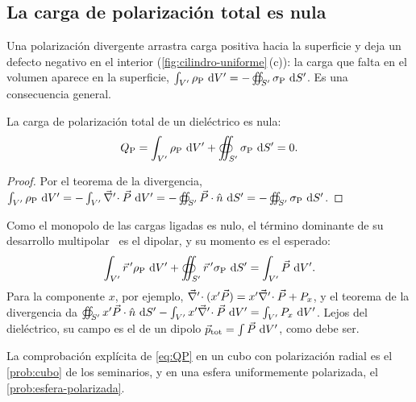 

\subsection{La carga de polarización total es nula}\label{sec:carga-total}

Una polarización divergente arrastra carga positiva hacia la superficie y deja un defecto negativo en el
interior (\cref{fig:cilindro-uniforme}\,(c)): la carga que falta en el volumen aparece en la superficie,
$\int_{V'}\rho_{\mathrm P}\,\mathop{}\!\mathrm{d} V'=-\oiint_{S'}\sigma_{\mathrm P}\,\mathop{}\!\mathrm{d} S'$. Es una consecuencia general.

\begin{proposicion}\label{prop:QP-nula}
La carga de polarización total de un dieléctrico es nula:
\begin{equation}\label{eq:QP}
  Q_{\mathrm P}=\int_{V'}\rho_{\mathrm P}\,\mathop{}\!\mathrm{d} V'+\oiint_{S'}\sigma_{\mathrm P}\,\mathop{}\!\mathrm{d} S'=0 .
\end{equation}
\end{proposicion}

\begin{proof}
Por el teorema de la divergencia,
$\int_{V'}\rho_{\mathrm P}\,\mathop{}\!\mathrm{d} V'=-\int_{V'}\vec\nabla'\!\cdot\vec P\,\mathop{}\!\mathrm{d} V'=-\oiint_{S'}\vec P\cdot\hat n\,\mathop{}\!\mathrm{d} S'=-\oiint_{S'}\sigma_{\mathrm P}\,\mathop{}\!\mathrm{d} S'$.
\end{proof}

\begin{observacion}\label{obs:momento-ligado}
Como el monopolo de las cargas ligadas es nulo, el término dominante de su desarrollo multipolar~\cite{T2} es
el dipolar, y su momento es el esperado:
\[
  \int_{V'}\vec r\,'\rho_{\mathrm P}\,\mathop{}\!\mathrm{d} V'+\oiint_{S'}\vec r\,'\sigma_{\mathrm P}\,\mathop{}\!\mathrm{d} S'=\int_{V'}\vec P\,\mathop{}\!\mathrm{d} V' .
\]
Para la componente $x$, por ejemplo, $\vec\nabla'\!\cdot(x'\vec P)=x'\vec\nabla'\!\cdot\vec P+P_x$, y el teorema de la divergencia da
$\oiint_{S'}x'\vec P\cdot\hat n\,\mathop{}\!\mathrm{d} S'-\int_{V'}x'\vec\nabla'\!\cdot\vec P\,\mathop{}\!\mathrm{d} V'=\int_{V'}P_x\,\mathop{}\!\mathrm{d} V'$. Lejos del dieléctrico, su campo es el
de un dipolo $\vec p_{\text{tot}}=\int\vec P\,\mathop{}\!\mathrm{d} V'$, como debe ser.
\end{observacion}

La comprobación explícita de \eqref{eq:QP} en un cubo con polarización radial es el \cref{prob:cubo} de
los seminarios, y en una esfera uniformemente polarizada, el \cref{prob:esfera-polarizada}.
